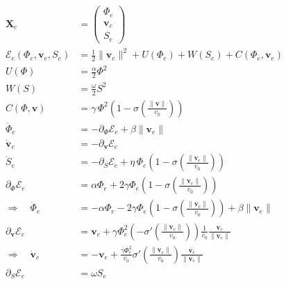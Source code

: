 \documentclass[11pt,oneside]{article}
\begin{document}
\begin{align}
\mathbf{X}_e
&=
\begin{pmatrix}
\Phi_e \\
\mathbf{v}_e \\
S_e
\end{pmatrix}
\\[10pt]

\mathcal{E}_e(\Phi_e,\mathbf{v}_e,S_e)
&=
\frac{1}{2}\|\mathbf{v}_e\|^2
+ U(\Phi_e)
+ W(S_e)
+ C(\Phi_e,\mathbf{v}_e)
\\[12pt]

U(\Phi)
&=
\frac{\alpha}{2}\Phi^2
\\[10pt]

W(S)
&=
\frac{\omega}{2}S^2
\\[10pt]

C(\Phi,\mathbf{v})
&=
\gamma\,\Phi^2
\left(1-\sigma\!\left(\frac{\|\mathbf{v}\|}{v_0}\right)\right)
\\[12pt]

\dot{\Phi}_e
&=
-\partial_{\Phi}\mathcal{E}_e
+
\beta \|\mathbf{v}_e\|
\\[10pt]

\dot{\mathbf{v}}_e
&=
-\partial_{\mathbf{v}}\mathcal{E}_e
\\[10pt]

\dot{S}_e
&=
-\partial_{S}\mathcal{E}_e
+
\eta\,\Phi_e
\left(1-\sigma\!\left(\frac{\|\mathbf{v}_e\|}{v_0}\right)\right)
\\[14pt]

\partial_{\Phi}\mathcal{E}_e
&=
\alpha\Phi_e
+
2\gamma\Phi_e
\left(1-\sigma\!\left(\frac{\|\mathbf{v}_e\|}{v_0}\right)\right)
\\[12pt]

\Rightarrow\quad
\dot{\Phi}_e
&=
-\alpha\Phi_e
-
2\gamma\Phi_e
\left(1-\sigma\!\left(\frac{\|\mathbf{v}_e\|}{v_0}\right)\right)
+
\beta \|\mathbf{v}_e\|
\\[14pt]

\partial_{\mathbf{v}}\mathcal{E}_e
&=
\mathbf{v}_e
+
\gamma\Phi_e^2
\left(-\sigma'\!\left(\frac{\|\mathbf{v}_e\|}{v_0}\right)\right)
\frac{1}{v_0}\frac{\mathbf{v}_e}{\|\mathbf{v}_e\|}
\\[12pt]

\Rightarrow\quad
\dot{\mathbf{v}}_e
&=
-\mathbf{v}_e
+
\frac{\gamma\Phi_e^2}{v_0}
\sigma'\!\left(\frac{\|\mathbf{v}_e\|}{v_0}\right)
\frac{\mathbf{v}_e}{\|\mathbf{v}_e\|}
\\[14pt]

\partial_S \mathcal{E}_e
&=
\omega S_e
\\[10pt]


\end{align}
\end{document}
